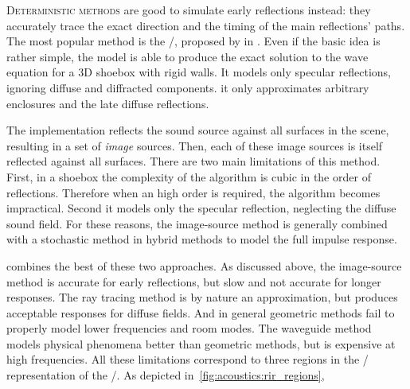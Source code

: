 \mynewline
\textsc{Deterministic methods} are good to simulate early reflections instead:
they accurately trace the exact direction and the timing of the main reflections' paths.
The most popular method is the \ISMdef/, proposed by \citeauthor{allen1979image} in .
Even if the basic idea is rather simple, the model is able to produce the exact solution to the wave equation for a 3D shoebox with rigid walls.
It models only specular reflections, ignoring diffuse and diffracted components.
it only approximates arbitrary enclosures and the late diffuse reflections.

\mynewline
The implementation reflects the sound source against all surfaces in the scene, resulting in a set of \textit{image} sources.
Then, each of these image sources is itself reflected against all surfaces.
There are two main limitations of this method.
First, in a shoebox the complexity of the algorithm is cubic in the order of reflections. Therefore when an high order is required, the algorithm becomes impractical.
Second it models only the specular reflection, neglecting the diffuse sound field.
For these reasons, the image-source method is generally combined with a stochastic method in hybrid methods to model the full impulse response.

 combines the best of these two approaches.
As discussed above, the image-source method is accurate for early reflections, but slow and not accurate for longer responses.
The ray tracing method is by nature an approximation, but produces acceptable responses for diffuse fields.
And in general geometric methods fail to properly model lower frequencies and room modes.
The waveguide method models physical phenomena better than geometric methods, but is expensive at high frequencies.
All these limitations correspond to three regions in the \TFdef/ representation of the \RIR/.
As depicted in~\cref{fig:acoustics:rir_regions},

